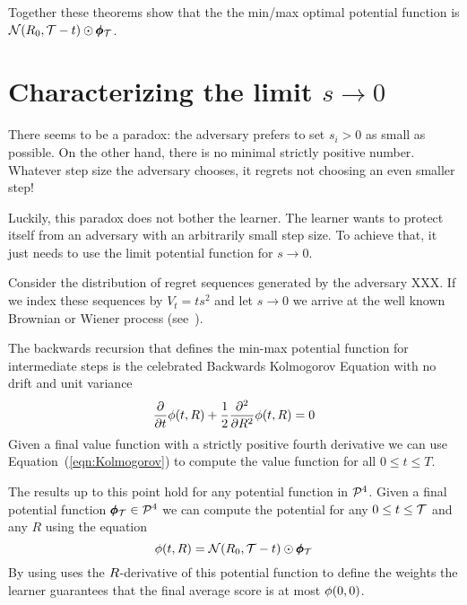 \documentclass{article}[12pt]
\begin{document}
Together these theorems show that the the min/max optimal potential function is $ {\cal N}(R_0,\mathcal{T}-t) \odot \pmb{\phi}_{\mathcal{T}}$.

\section{Characterizing the limit $s \to 0$}
\label{sec:continuous}

There seems to be a paradox: the adversary prefers to set $s_i>0$ as
small as possible. On the other hand, there is no minimal strictly
positive number. Whatever step size the adversary chooses, it regrets
not choosing an even smaller step!

Luckily, this paradox does not bother the learner. The learner wants
to protect itself from an adversary with an arbitrarily small step
size. To achieve that, it just needs to use the limit potential function for $s \to 0$.

Consider the distribution of regret sequences generated by the adversary XXX. If we index these sequences by $V_t = ts^2$ and let $s \to 0$ we arrive at the well known Brownian or Wiener process
(see~\cite{kac1947random}).


The backwards recursion that defines the min-max potential function
for intermediate steps is the celebrated Backwards Kolmogorov Equation
with no drift and unit variance
\begin{equation} \label{eqn:Kolmogorov}
  \frac{\partial}{\partial t} \phi(t,R)
  + \frac{1}{2} \frac{\partial^2}{\partial R^2} \phi(t,R)=0
\end{equation}
Given a final value function with a strictly positive fourth
derivative we can use Equation~(\ref{eqn:Kolmogorov}) to compute the
value function for all $0 \leq t \leq T$. 

The results up to this point hold for any potential function in
${\cal P}^{4}$. Given a final potential function $\pmb{\phi}_{\mathcal{T}} \in {\cal P}^{4}$ we
can compute the potential for any $0 \leq t \leq \mathcal{T}$ and any $R$ using the equation 
\begin{equation} \label{eqn:convol-with-normal}
\phi(t,R)={\cal N}(R_0,\mathcal{T}-t) \odot \pmb{\phi}_{\mathcal{T}}
\end{equation}
By using uses the $R$-derivative of this potential function to define
the weights the learner guarantees that the final average score is at
most $\phi(0,0)$.
\end{document}
